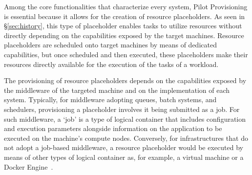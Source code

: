 \documentclass{sig-alternate}
\begin{document}
Among the core functionalities that characterize every \pilotjob system, Pilot
Provisioning is essential because it allows for the creation of resource
placeholders. As seen in \S\ref{sec:history}, this type of placeholder enables
tasks to utilize resources without directly depending on the capabilities
exposed by the target machines. Resource placeholders are scheduled onto target
machines by means of dedicated capabilities, but once scheduled and then
executed, these placeholders make their resources directly available for the
execution of the tasks of a workload.




The provisioning of resource placeholders depends on the capabilities exposed by
the middleware of the targeted machine and on the implementation of each \pilot
system. Typically, for middleware adopting queues, batch systems, and
schedulers, provisioning a placeholder involves it being submitted as a job.
For such middleware, a `job' is a type of logical container that includes
configuration and execution parameters alongside information on the application
to be executed on the machine's compute nodes. Conversely, for
infrastructures that do not adopt a job-based middleware, a resource placeholder
would be executed by means of other types of logical container as, for example,
a virtual machine or a Docker Engine~\cite{bernstein2014,felter2014}.
\end{document}
